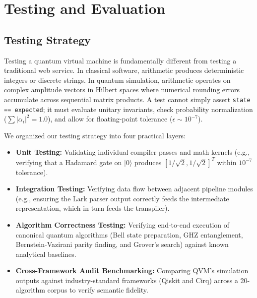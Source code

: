 \chapter{Testing and Evaluation}

\section{Testing Strategy}
Testing a quantum virtual machine is fundamentally different from testing a traditional web service. In classical software, arithmetic produces deterministic integers or discrete strings. In quantum simulation, arithmetic operates on complex amplitude vectors in Hilbert spaces where numerical rounding errors accumulate across sequential matrix products. A test cannot simply assert \texttt{state == expected}; it must evaluate unitary invariants, check probability normalization ($\sum |\alpha_i|^2 = 1.0$), and allow for floating-point tolerance ($\epsilon \sim 10^{-7}$).

We organized our testing strategy into four practical layers:
\begin{itemize}[leftmargin=*]
    \item \textbf{Unit Testing:} Validating individual compiler passes and math kernels (e.g., verifying that a Hadamard gate on $|0\rangle$ produces $[1/\sqrt{2}, 1/\sqrt{2}]^T$ within $10^{-7}$ tolerance).
    \item \textbf{Integration Testing:} Verifying data flow between adjacent pipeline modules (e.g., ensuring the Lark parser output correctly feeds the intermediate representation, which in turn feeds the transpiler).
    \item \textbf{Algorithm Correctness Testing:} Verifying end-to-end execution of canonical quantum algorithms (Bell state preparation, GHZ entanglement, Bernstein-Vazirani parity finding, and Grover's search) against known analytical baselines.
    \item \textbf{Cross-Framework Audit Benchmarking:} Comparing QVM's simulation outputs against industry-standard frameworks (Qiskit and Cirq) across a 20-algorithm corpus to verify semantic fidelity.
\end{itemize}

